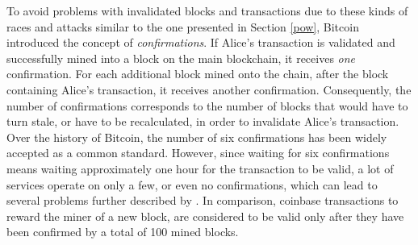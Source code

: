 \documentclass[a4paper,12pt,twoside]{report}
\begin{document}
To avoid problems with invalidated blocks and transactions due to these kinds of races and attacks similar to the one presented in Section \ref{pow}, Bitcoin introduced the concept of \textit{confirmations}. If Alice's transaction is validated and successfully mined into a block on the main blockchain, it receives \textit{one} confirmation. For each additional block mined onto the chain, after the block containing Alice's transaction, it receives another confirmation. Consequently, the number of confirmations corresponds to the number of blocks that would have to turn stale, or have to be recalculated, in order to invalidate Alice's transaction. Over the history of Bitcoin, the number of six confirmations has been widely accepted as a common standard. However, since waiting for six confirmations means waiting approximately one hour for the transaction to be valid, a lot of services operate on only a few, or even no confirmations, which can lead to several problems further described by \cite{premining1}. In comparison, coinbase transactions to reward the miner of a new block, are considered to be valid only after they have been confirmed by a total of 100 mined blocks. \cite{antonopoulos2017mastering}
\end{document}
